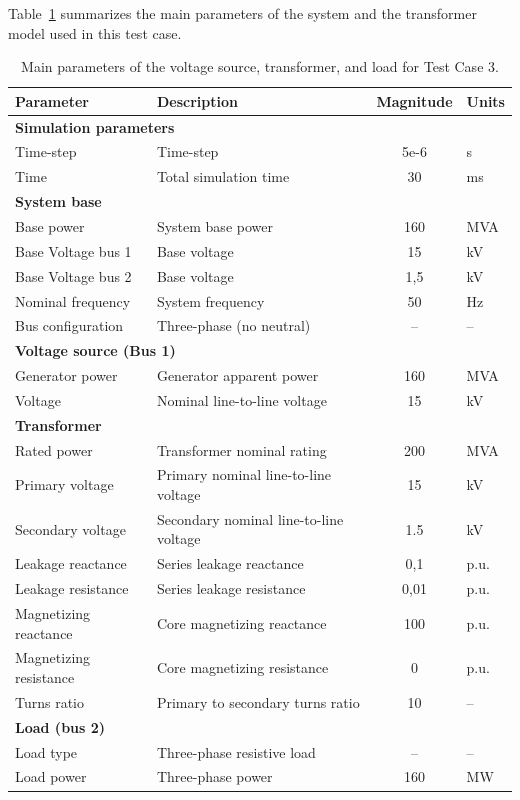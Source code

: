 Table~\ref{tab:test_case_3_parameters} summarizes the main parameters of the system and the transformer model used in this test case.
\begin{table}[htbp!]
\centering
\caption{Main parameters of the voltage source, transformer, and load for Test Case 3.}
\label{tab:test_case_3_parameters}
\renewcommand{\arraystretch}{1.2}
\begin{tabular}{|l|l|c|l|}
\hline
\textbf{Parameter} & \textbf{Description} & \textbf{Magnitude} & \textbf{Units} \\
\hline
\multicolumn{4}{|l|}{\textbf{Simulation parameters}} \\
\hline
Time-step & Time-step & 5e-6 & s \\
Time & Total simulation time & 30 & ms \\
\hline
\multicolumn{4}{|l|}{\textbf{System base}} \\
\hline
Base power & System base power & 160 & MVA \\
Base Voltage bus 1 & Base voltage & 15 & kV \\
Base Voltage bus 2 & Base voltage & 1,5 & kV \\
Nominal frequency & System frequency & 50 & Hz \\
Bus configuration & Three-phase (no neutral) & -- & -- \\
\hline
\multicolumn{4}{|l|}{\textbf{Voltage source (Bus 1)}} \\
\hline
Generator power & Generator apparent power & 160 & MVA \\
Voltage & Nominal line-to-line voltage & 15 & kV \\
\hline
\multicolumn{4}{|l|}{\textbf{Transformer}} \\
\hline
Rated power & Transformer nominal rating & 200 & MVA \\
Primary voltage & Primary nominal line-to-line voltage & 15 & kV \\
Secondary voltage & Secondary nominal line-to-line voltage & 1.5 & kV \\
Leakage reactance & Series leakage reactance & 0,1 & p.u. \\
Leakage resistance & Series leakage resistance & 0,01 & p.u. \\
Magnetizing reactance & Core magnetizing reactance & 100 & p.u. \\
Magnetizing resistance & Core magnetizing resistance & 0 & p.u. \\
Turns ratio & Primary to secondary turns ratio & 10 & -- \\
\hline
\multicolumn{4}{|l|}{\textbf{Load (bus 2)}} \\
\hline
Load type & Three-phase resistive load & -- & -- \\
Load power & Three-phase power & 160 & MW\\
\hline
\end{tabular}
\end{table}

